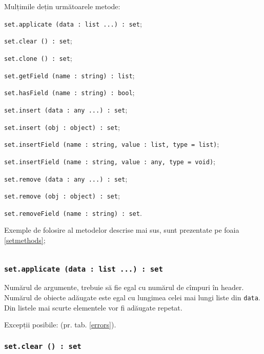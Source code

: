 Mulțimile dețin următoarele metode:
\begin{icItems}
\item \texttt{set.applicate (data : list ...) : set};
\item \texttt{set.clear () : set};
\item \texttt{set.clone () : set};
\item \texttt{set.getField (name : string) : list};
\item \texttt{set.hasField (name : string) : bool};
\item \texttt{set.insert (data : any ...) : set};
\item \texttt{set.insert (obj : object) : set};
\item \texttt{set.insertField (name : string, value : list, type = list)};
\item \texttt{set.insertField (name : string, value : any, type = void)};
\item \texttt{set.remove (data : any ...) : set};
\item \texttt{set.remove (obj : object) : set};
\item \texttt{set.removeField (name : string) : set}.
\end{icItems}

Exemple de folosire al metodelor descrise mai sus, sunt prezentate pe foaia \ref{setmethods};

\begin{sourcecode}
    \label{setmethods}
    \inputminted[linenos]{icl}{../sources/setmethods.icL}
\end{sourcecode}

\subsubsection{\texttt{set.applicate (data : list ...) : set}}

Numărul de argumente, trebuie să fie egal cu numărul de cîmpuri în header. Numărul de obiecte adăugate este egal cu lungimea celei mai lungi liste din \texttt{data}. Din listele mai scurte elementele vor fi adăugate repetat.

Excepții posibile:  (pr. tab. \ref{errors}).

\subsubsection{\texttt{set.clear () : set}}

